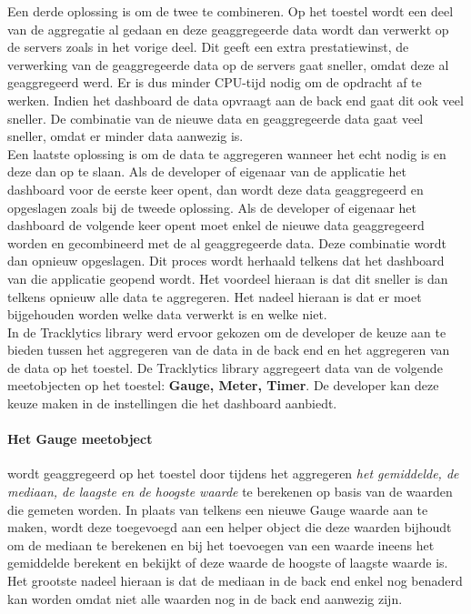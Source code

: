 Een derde oplossing is om de twee te combineren. Op het toestel wordt een deel van de aggregatie al gedaan en deze geaggregeerde data wordt dan verwerkt op de servers zoals in het vorige deel. Dit geeft een extra prestatiewinst, de verwerking van de geaggregeerde data op de servers gaat sneller, omdat deze al geaggregeerd werd. Er is dus minder CPU-tijd nodig om de opdracht af te werken. Indien het dashboard de data opvraagt aan de back end gaat dit ook veel sneller. De combinatie van de nieuwe data en geaggregeerde data gaat veel sneller, omdat er minder data aanwezig is. \\

Een laatste oplossing is om de data te aggregeren wanneer het echt nodig is en deze dan op te slaan. Als de developer of eigenaar van de applicatie het dashboard voor de eerste keer opent, dan wordt deze data geaggregeerd en opgeslagen zoals bij de tweede oplossing. Als de developer of eigenaar het dashboard de volgende keer opent moet enkel de nieuwe data geaggregeerd worden en gecombineerd met de al geaggregeerde data. Deze combinatie wordt dan opnieuw opgeslagen. Dit proces wordt herhaald telkens dat het dashboard van die applicatie geopend wordt. Het voordeel hieraan is dat dit sneller is dan telkens opnieuw alle data te aggregeren. Het nadeel hieraan is dat er moet bijgehouden worden welke data verwerkt is en welke niet. \\


In de Tracklytics library werd ervoor gekozen om de developer de keuze aan te bieden tussen het aggregeren van de data in de back end en het aggregeren van de data op het toestel. De Tracklytics library aggregeert data van de volgende meetobjecten op het toestel: \textbf{Gauge, Meter, Timer}. De developer kan deze keuze maken in de instellingen die het dashboard aanbiedt. \\

\paragraph{Het Gauge meetobject} wordt geaggregeerd op het toestel door tijdens het aggregeren \textit{het gemiddelde, de mediaan, de laagste en de hoogste waarde} te berekenen op basis van de waarden die gemeten worden. In plaats van telkens een nieuwe Gauge waarde aan te maken, wordt deze toegevoegd aan een helper object die deze waarden bijhoudt om de mediaan te berekenen en bij het toevoegen van een waarde ineens het gemiddelde berekent en bekijkt of deze waarde de hoogste of laagste waarde is. Het grootste nadeel hieraan is dat de mediaan in de back end enkel nog benaderd kan worden omdat niet alle waarden nog in de back end aanwezig zijn. \\

